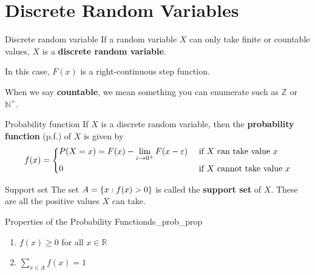\section{Discrete Random Variables}
\begin{Definition}{Discrete random variable}{}
    If a random variable $ X $ can only take
    finite or countable values, $ X $
    is a \textbf{discrete random variable}.
\end{Definition}
In this case, $ F(x) $ is a right-continuous
step function.
\begin{Remark}{}{}
    When we say \textbf{countable}, we mean
    something you can enumerate such as $ \mathbb{Z} $ or
    $ \mathbb{N}^+ $.
\end{Remark}

\begin{Definition}{Probability function}{}
    If $ X $ is a discrete random variable,
    then the \textbf{probability function} (p.f.) of $ X $ is given by
    \[ f(x)=
        \begin{dcases}
            P(X=x)=
            F(x)-\lim\limits_{{\varepsilon} \to {0^+}}
            F(x-\varepsilon) & \text{ if } X\text{ can take value }x    \\
            0                & \text{ if } X\text{ cannot take value }x
        \end{dcases} \]
\end{Definition}

\begin{Definition}{Support set}{}
    The set $ A=\{x:f(x)>0\} $ is called the \textbf{support set}
    of $ X $. These are all the positive values $ X $ can take.
\end{Definition}

\begin{Proposition}{Properties of the Probability Function}{ds_prob_prop}
    \begin{enumerate}[label=(\arabic*)]
        \item $ f(x)\geqslant 0 $ for all $ x\in\mathbb{R} $
        \item $ \sum\limits_{x\in A}f(x)=1 $
    \end{enumerate}
\end{Proposition}

